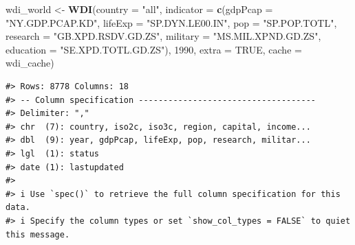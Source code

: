 \documentclass[
  xelatex, ja=standard]{bxjsbook}
\newenvironment{Shaded}{\begin{snugshade}}{\end{snugshade}}
\newcommand{\AttributeTok}[1]{\textcolor[rgb]{0.13,0.29,0.53}{#1}}
\newcommand{\ConstantTok}[1]{\textcolor[rgb]{0.56,0.35,0.01}{#1}}
\newcommand{\DecValTok}[1]{\textcolor[rgb]{0.00,0.00,0.81}{#1}}
\newcommand{\FunctionTok}[1]{\textcolor[rgb]{0.13,0.29,0.53}{\textbf{#1}}}
\newcommand{\NormalTok}[1]{#1}
\newcommand{\OtherTok}[1]{\textcolor[rgb]{0.56,0.35,0.01}{#1}}
\newcommand{\StringTok}[1]{\textcolor[rgb]{0.31,0.60,0.02}{#1}}
\theoremstyle{definition}
\theoremstyle{definition}
\theoremstyle{definition}
\theoremstyle{definition}
\theoremstyle{remark}
\begin{document}
\begin{Shaded}
\begin{Highlighting}[]
\NormalTok{wdi\_world }\OtherTok{\textless{}{-}} \FunctionTok{WDI}\NormalTok{(}\AttributeTok{country =} \StringTok{"all"}\NormalTok{, }\AttributeTok{indicator =} \FunctionTok{c}\NormalTok{(}\AttributeTok{gdpPcap =} \StringTok{"NY.GDP.PCAP.KD"}\NormalTok{, }\AttributeTok{lifeExp =} \StringTok{"SP.DYN.LE00.IN"}\NormalTok{, }\AttributeTok{pop =} \StringTok{"SP.POP.TOTL"}\NormalTok{, }\AttributeTok{research =} \StringTok{"GB.XPD.RSDV.GD.ZS"}\NormalTok{, }\AttributeTok{military =} \StringTok{"MS.MIL.XPND.GD.ZS"}\NormalTok{, }\AttributeTok{education =} \StringTok{"SE.XPD.TOTL.GD.ZS"}\NormalTok{), }\DecValTok{1990}\NormalTok{, }\AttributeTok{extra =} \ConstantTok{TRUE}\NormalTok{, }\AttributeTok{cache =}\NormalTok{ wdi\_cache)}
\end{Highlighting}
\end{Shaded}

\begin{verbatim}
#> Rows: 8778 Columns: 18
#> -- Column specification ------------------------------------
#> Delimiter: ","
#> chr  (7): country, iso2c, iso3c, region, capital, income...
#> dbl  (9): year, gdpPcap, lifeExp, pop, research, militar...
#> lgl  (1): status
#> date (1): lastupdated
#> 
#> i Use `spec()` to retrieve the full column specification for this data.
#> i Specify the column types or set `show_col_types = FALSE` to quiet this message.
\end{verbatim}
\end{document}
